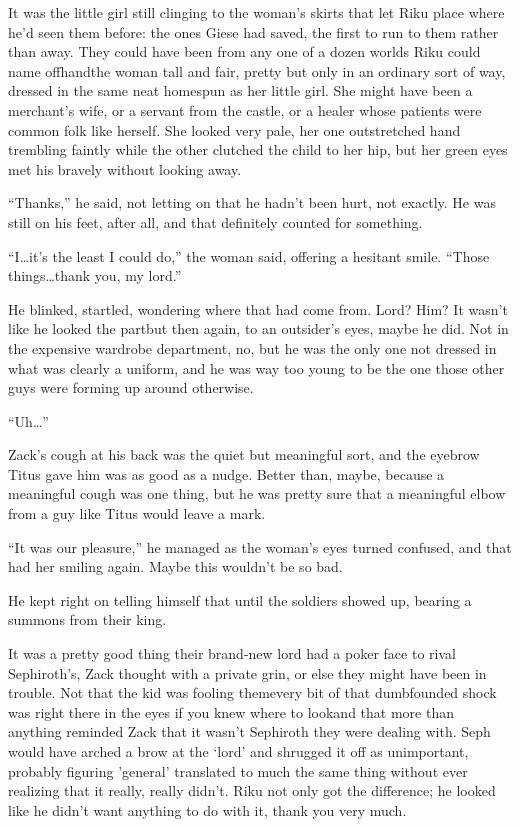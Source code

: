 It was the little girl still clinging to the woman's skirts that let Riku place where he'd seen them before: the ones Giese had saved, the first to run to them rather than away. They could have been from any one of a dozen worlds Riku could name offhand\textemdash the woman tall and fair, pretty but only in an ordinary sort of way, dressed in the same neat homespun as her little girl. She might have been a merchant's wife, or a servant from the castle, or a healer whose patients were common folk like herself. She looked very pale, her one outstretched hand trembling faintly while the other clutched the child to her hip, but her green eyes met his bravely without looking away.

``Thanks,'' he said, not letting on that he hadn't been hurt, not exactly. He was still on his feet, after all, and that definitely counted for something.

``I\ldots it's the least I could do,'' the woman said, offering a hesitant smile. ``Those things\ldots thank you, my lord.''

He blinked, startled, wondering where that had come from. Lord? Him? It wasn't like he looked the part\textemdash but then again, to an outsider's eyes, maybe he did. Not in the expensive wardrobe department, no, but he was the only one not dressed in what was clearly a uniform, and he was way too young to be the one those other guys were forming up around otherwise.

``Uh\ldots ''

Zack's cough at his back was the quiet but meaningful sort, and the eyebrow Titus gave him was as good as a nudge. Better than, maybe, because a meaningful cough was one thing, but he was pretty sure that a meaningful elbow from a guy like Titus would leave a mark.

``It was our pleasure,'' he managed as the woman's eyes turned confused, and that had her smiling again. Maybe this wouldn't be so bad.

He kept right on telling himself that until the soldiers showed up, bearing a summons from their king.


\scenechange


It was a pretty good thing their brand-new lord had a poker face to rival Sephiroth's, Zack thought with a private grin, or else they might have been in trouble. Not that the kid was fooling them\textemdash every bit of that dumbfounded shock was right there in the eyes if you knew where to look\textemdash and that more than anything reminded Zack that it wasn't Sephiroth they were dealing with. Seph would have arched a brow at the `lord' and shrugged it off as unimportant, probably figuring 'general' translated to much the same thing without ever realizing that it really, really didn't. Riku not only got the difference; he looked like he didn't want anything to do with it, thank you very much.

